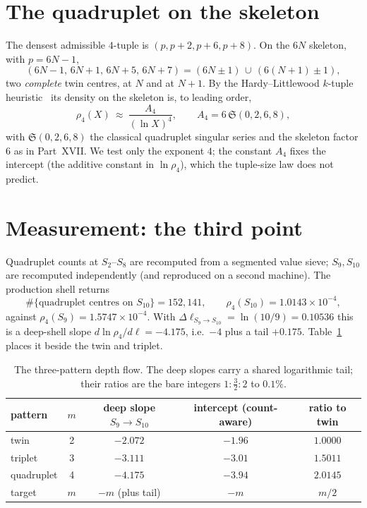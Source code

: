 \documentclass[11pt]{article}
\begin{document}
\section{The quadruplet on the skeleton}

The densest admissible $4$-tuple is $(p,p+2,p+6,p+8)$. On the $6N$ skeleton, with
$p=6N-1$,
\[
  (6N-1,\,6N+1,\,6N+5,\,6N+7)
  =(6N\!\pm\!1)\,\cup\,(6(N{+}1)\!\pm\!1),
\]
two \emph{complete} twin centres, at $N$ and at $N+1$. By the Hardy--Littlewood
$k$-tuple heuristic~\cite{HL} its density on the skeleton is, to leading order,
\begin{equation}\label{eq:hl4}
  \rho_4(X)\ \approx\ \frac{A_4}{(\ln X)^4},\qquad A_4=6\,\mathfrak{S}(0,2,6,8),
\end{equation}
with $\mathfrak{S}(0,2,6,8)$ the classical quadruplet singular series and the
skeleton factor $6$ as in Part~XVII. We test only the exponent $4$; the constant
$A_4$ fixes the intercept (the additive constant in $\ln\rho_4$), which the
tuple-size law does not predict.

\section{Measurement: the third point}

Quadruplet counts at $S_2$--$S_8$ are recomputed from a segmented value sieve;
$S_9,S_{10}$ are recomputed independently (and reproduced on a second machine).
The production shell returns
\[
  \#\{\text{quadruplet centres on }S_{10}\}=152{,}141,\qquad
  \rho_4(S_{10})=1.0143\times10^{-4},
\]
against $\rho_4(S_9)=1.5747\times10^{-4}$. With
$\Delta\ell_{S_9\to S_{10}}=\ln(10/9)=0.10536$ this is a deep-shell slope
$d\ln\rho_4/d\ell=-4.175$, i.e.\ $-4$ plus a tail $+0.175$. Table~\ref{tab:three}
places it beside the twin and triplet.

\begin{table}[h]\centering\small
\begin{tabular}{lcccc}
\toprule
pattern & $m$ & deep slope $S_9\!\to\!S_{10}$ & intercept (count-aware) & ratio to twin\\
\midrule
twin       & 2 & $-2.072$ & $-1.96$ & $1.0000$\\
triplet    & 3 & $-3.111$ & $-3.01$ & $1.5011$\\
quadruplet & 4 & $-4.175$ & $-3.94$ & $2.0145$\\
\midrule
target     & $m$ & $-m$ (plus tail) & $-m$ & $m/2$\\
\bottomrule
\end{tabular}
\caption{The three-pattern depth flow. The deep slopes carry a shared
logarithmic tail; their ratios are the bare integers $1:\tfrac32:2$ to $0.1\%$.}
\label{tab:three}
\end{table}
\end{document}

